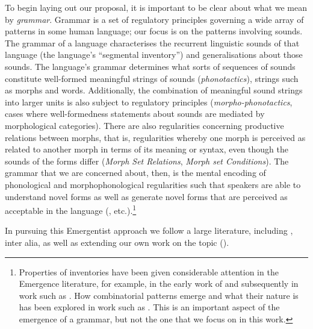 \largerpage[-1]
To begin laying out our proposal, it is important to be clear about what we mean by \textit{grammar}. Grammar is a set of regulatory principles governing a wide array of patterns in some human language; our focus is on the patterns involving sounds. The grammar of a language characterises the recurrent linguistic sounds of that language (the language's ``segmental inventory'') and generalisations about those sounds. The language's grammar determines what sorts of sequences of sounds constitute well-formed meaningful strings  of sounds (\textit{phonotactics}), strings such as morphs and words.  Additionally, the combination of meaningful sound strings into larger units is also subject to regulatory principles (\textit{morpho-phonotactics}, cases where  well-formedness statements about sounds are mediated by morphological categories). There are also regularities concerning productive relations between morphs, that is, regularities whereby one morph is perceived as related to another morph in terms of its meaning or syntax, even though the sounds of the forms differ (\textit{Morph Set Relations}, \textit{Morph set Conditions}).  The grammar that we are concerned about, then,  is the mental encoding of phonological and morphophonological regularities such that speakers are able to understand novel forms as well as generate novel forms that are perceived as acceptable in the language (\citealt{Berko:1958}, etc.).\footnote{Properties of inventories have been given considerable attention in the Emergence literature, for example, in the early work of \citet{Lindblom:1999} and subsequently in work such as \citet{Mielke:2008, Cohn:2011}. How combinatorial patterns emerge and what their nature is has been explored in work such as \citet{Cole:2009}. This is an important aspect of the emergence of a grammar, but not the one that we focus on in this work.}
 

In pursuing this Emergentist approach we follow a large literature, including \citet{Hopper:1987, Lacerda:1995, Deacon:1997, Bybee:1998lexicon, Hopper:1998, Lacerda:1998, Bybee:1999, Lindblom:1999, MacWhinney:1999, Lindblom:2000, Frisch+:2001, Kochetov:2002, Lacerda:2003, Harrison+:2007, OGrady:2008, Beckner+:2009, Cole:2009, Pater:2012,Hopper:2015, McCauley+:2015, Racz+:2015, Weijer:2017, Haspelmath:2020}, inter alia, as well as extending our own work on the topic (\citealt{Mohanan+:2010, Archangeli+:2011Paris, Archangeli+:2012Korea,  Archangeli+:2012McGill, Archangeli+:2012Smith, Archangeli+:2013WCCFL, Archangeli+:2014freeling, Archangeli+:2014lshk, Archangeli+:2015_Frontiers, Archangeli+:2015HKUtone, Archangeli+:2015_K-tone, Archangeli+:2015_YVH, Archangeli+:2016mm, Archangeli+:2017-Setswana, Anghelescu+:2017, Gambarage+:2017, Archangeli+:2018routledge, Archangeli+:2014abidjan}).


